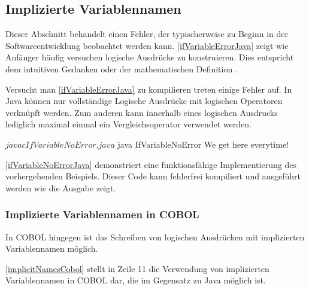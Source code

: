 \subsection{Implizierte Variablennamen}
Dieser Abschnitt behandelt einen Fehler, der typischerweise zu Beginn in der Softwareentwicklung beobachtet werden kann. \autoref{ifVariableErrorJava} zeigt wie Anfänger häufig versuchen logische Ausdrücke zu konstruieren. Dies entspricht dem intuitiven Gedanken  oder der mathematischen Definition .

\sepCodeAndOutputCheck
\begin{shellwindow}
$ javac -Xmaxerrs 3 IfVariableError.java 
IfVariableError.java:4: error: > expected
        if (System.currentTimeMillis() > 0 && < Long.MAX_VALUE) {
                                                              ^
IfVariableError.java:4: error: ')' expected
        if (System.currentTimeMillis() > 0 && < Long.MAX_VALUE) {
                                                               ^
IfVariableError.java:8: error: illegal start of type
        if (0 < System.currentTimeMillis() < Long.MAX_VALUE) {
        ^
3 errors
\end{shellwindow}
Versucht man \autoref{ifVariableErrorJava} zu kompilieren treten einige Fehler auf. In Java können nur vollständige Logische Ausdrücke mit logischen Operatoren verknüpft werden. Zum anderen kann innerhalb eines logischen Ausdrucks lediglich maximal einmal ein Vergleichsoperator verwendet werden. 

\sepCodeAndOutputCheck
\begin{shellwindow}
$ javac IfVariableNoError.java 
$ java IfVariableNoError
We get here everytime!
\end{shellwindow}
\autoref{ifVariableNoErrorJava} demonstriert eine funktionsfähige Implementierung des vorhergehenden Beispiels. Dieser Code kann fehlerfrei kompiliert und ausgeführt werden wie die Ausgabe zeigt.

\subsubsection*{Implizierte Variablennamen in COBOL}
In COBOL hingegen ist das Schreiben von logischen Ausdrücken mit implizierten Variablennamen möglich.

\autoref{implicitNamesCobol} stellt in Zeile 11 die Verwendung von implizierten Variablennamen in COBOL dar, die im Gegensatz zu Java möglich ist.